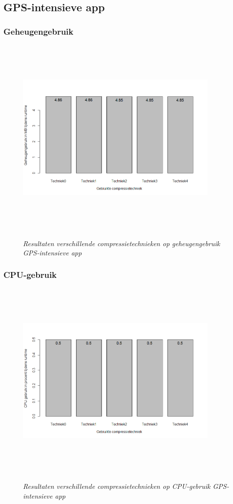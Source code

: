 \subsection{GPS-intensieve app}
\subsubsection{Geheugengebruik}
\begin{figure}[H]
	\centering
	\caption{\textit{Resultaten verschillende compressietechnieken op geheugengebruik GPS-intensieve app}}
	\includegraphics[width=10cm, height=10cm, keepaspectratio]{img/app2geheugen}\\[.5cm]
	
\end{figure}
\subsubsection{CPU-gebruik}
\begin{figure}[H]
	\centering
	\caption{\textit{Resultaten verschillende compressietechnieken op CPU-gebruik GPS-intensieve app}}
	\includegraphics[width=10cm, height=10cm, keepaspectratio]{img/app2cpu}\\[.5cm]
	
\end{figure}
